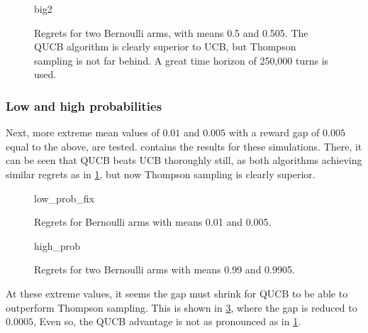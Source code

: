 \begin{figure}
    \centering
    \newcommand{\myoptions}{
        width=10cm,
        height=8cm,
        xlabel={Kiloturn},
        ylabel={Regret},
        legend entries={UCB, QUCB, Thompson},
        legend pos=north west,
        legend cell align=left,
        mystyle,
    }
    {big2}
    \caption[
        Regrets for two Bernoulli arms, with means 0.5 and 0.505.
    ]{
        Regrets for two Bernoulli arms, with means 0.5 and 0.505.
        The QUCB algorithm is clearly superior to UCB, but Thompson sampling is not far behind.
        A great time horizon of 250,000 turns is used.
    }
    \label{fig:big2}
\end{figure}

\subsubsection{Low and high probabilities}
Next, more extreme mean values of $0.01$ and $0.005$ with a reward gap of $0.005$ equal to the above, are tested.
 contains the results for these simulations.
There, it can be seen that QUCB beats UCB thoroughly still, as both algorithms achieving similar regrets as in \cref{fig:big2}, but now Thompson sampling is clearly superior.

\begin{figure}
    \centering
    \newcommand{\myoptions}{
        width=10cm,
        height=8cm,
        xlabel={Kiloturn},
        ylabel={Regret},
        legend entries={UCB, QUCB, Thompson},
        legend pos=north west,
        legend cell align=left,
        mystyle,
    }
    {low_prob_fix}
    \caption{Regrets for Bernoulli arms with means 0.01 and 0.005.}
    \label{fig:low_prob_fix}
\end{figure}

\begin{figure}
    \centering
    \newcommand{\myoptions}{
        width=10cm,
        height=8cm,
        xlabel={Kiloturn},
        ylabel={Regret},
        legend entries={UCB, QUCB, Thompson},
        legend pos=north west,
        legend cell align=left,
        mystyle,
    }
    {high_prob}
    \caption{Regrets for two Bernoulli arms with means 0.99 and 0.9905.}
    \label{fig:high_prob}
\end{figure}

At these extreme values, it seems the gap must shrink for QUCB to be able to outperform Thompson sampling.
This is shown in \cref{fig:high_prob}, where the gap is reduced to $0.0005$,
Even so, the QUCB advantage is not as pronounced as in \cref{fig:big2}.

